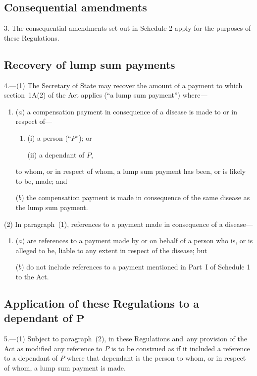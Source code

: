 \documentclass[12pt,a4paper]{article}
\begin{document}
\subsection[3. Consequential amendments]{Consequential amendments}

3.  The consequential amendments set out in Schedule 2 apply for the purposes of these Regulations.

\subsection[4. Recovery of lump sum payments]{Recovery of lump sum payments}

4.---(1)  The Secretary of State may recover the amount of a payment to which section~1A(2) of the Act applies (“a lump sum payment”) where—
\begin{enumerate}\item[]
($a$) a compensation payment in consequence of a disease is made to or in respect of—
\begin{enumerate}\item[]
(i) a person (“$P$”); or

(ii) a dependant of $P$,
\end{enumerate}
to whom, or in respect of whom, a lump sum payment has been, or is likely to be, made; and

($b$) the compensation payment is made in consequence of the same disease as the lump sum payment.
\end{enumerate}

(2) In paragraph~(1), references to a payment made in consequence of a disease—
\begin{enumerate}\item[]
($a$) are references to a payment made by or on behalf of a person who is, or is alleged to be, liable to any extent in respect of the disease; but

($b$) do not include references to a payment mentioned in Part~I of Schedule 1 to the Act.
\end{enumerate}

\subsection[5. Application of these Regulations to a dependant of $P$]{Application of these Regulations to a dependant of $\mathbf{P}$}

5.---(1)  Subject to paragraph~(2), in these Regulations and~any provision of the Act as modified any reference to $P$ is to be construed as if it included a reference to a dependant of $P$ where that dependant is the person to whom, or in respect of whom, a lump sum payment is made.
\end{document}
